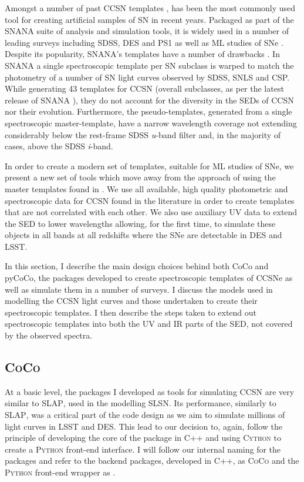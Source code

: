 Amongst a number of past CCSN templates \citep{Schlegel1995,Nugent2006}, \citet{Kessler2009} has been the most commonly used tool for creating artificial samples of SN in recent years. Packaged as part of the \textsc{SNANA} suite of analysis and simulation tools, it is widely used in a number of leading surveys including SDSS, DES and PS1 as well as ML studies of SNe \citep{Kessler2010,Lochner2016}. Despite its popularity, \textsc{SNANA}'s templates have a number of drawbacks \citep{Kessler2010}. In \textsc{SNANA} a single spectroscopic template per SN subclass \citep[Taken from]{Nugent2006} is warped to match the photometry of a number of SN light curves observed by SDSS, SNLS and CSP. While generating 43 templates for CCSN (overall subclasses, as per the latest release of \textsc{SNANA} \citep{Jones2016}), they do not account for the diversity in the SEDs of CCSN nor their evolution. Furthermore, the pseudo-templates, generated from a single spectroscopic master-template, have a narrow wavelength coverage not extending considerably below the rest-frame SDSS \textit{u}-band filter and, in the majority of cases, above the SDSS \textit{i}-band.

In order to create a modern set of templates, suitable for ML studies of SNe, we present a new set of tools which move away from the approach of using the master templates found in \citet{Nugent2006}. We use all available, high quality photometric and spectroscopic data for CCSN found in the literature in order to create templates that are not correlated with each other. We also use auxiliary UV data to extend the SED to lower wavelengths allowing, for the first time, to simulate these objects in all bands at all redshifts where the SNe are detectable in DES and LSST.

In this section, I describe the main design choices behind both CoCo and pyCoCo, the packages developed to create spectroscopic templates of CCSNe as well as simulate them in a number of surveys. I discuss the models used in modelling the CCSN light curves and those undertaken to create their spectroscopic templates. I then describe the steps taken to extend out spectroscopic templates into both the UV and IR parts of the SED, not covered by the observed spectra.

\subsection{\textsc{CoCo}}
At a basic level, the packages I developed as tools for simulating CCSN are very similar to \textsc{SLAP}, used in the modelling SLSN. Its performance, similarly to \textsc{SLAP}, was a critical part of the code design as we aim to simulate millions of light curves in LSST and DES. This lead to our decision to, again, follow the principle of developing the core of the package in \textsc{C++} and using \textsc{Cython} to create a \textsc{Python} front-end interface. I will follow our internal naming for the packages and refer to the backend packages, developed in \textsc{C++}, as \textsc{CoCo} and the \textsc{Python} front-end wrapper as .

